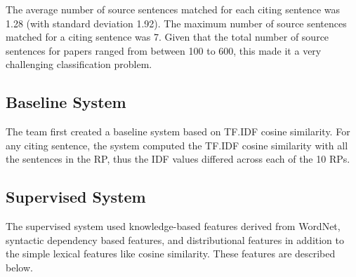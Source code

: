 \documentclass[11pt]{article}
\begin{document}
The average number of source sentences matched for each citing sentence was 
1.28 (with standard deviation 1.92). The maximum number of source sentences 
matched for a citing sentence was 7. Given that the total number of source 
sentences for papers ranged from between 100 to 600, this made it a very 
challenging classification problem. 

\subsection{Baseline System}

The team first created a baseline system based on TF.IDF cosine
similarity. For any citing sentence, the system computed the TF.IDF
cosine similarity with all the sentences in the RP, thus the IDF
values differed across each of the 10 RPs.

\subsection{Supervised System}
The supervised system used knowledge-based features derived from WordNet,
syntactic dependency based features, and distributional features in addition 
to the simple lexical features like cosine similarity. These features are 
described below.
\end{document}
